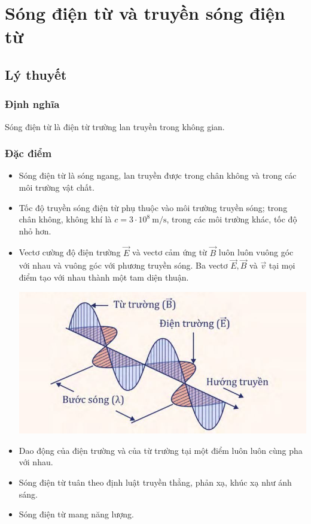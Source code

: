 
\chapter[Sóng điện từ và truyền sóng điện từ]{Sóng điện từ và truyền sóng điện từ}
\section{Lý thuyết}
\subsection{Định nghĩa}
Sóng điện từ là điện từ trường lan truyền trong không gian.
\subsection {Đặc điểm}
\begin{itemize}
	\item Sóng điện từ là sóng ngang, lan truyền được trong chân không và trong các môi trường vật chất.
	\item Tốc độ truyền sóng điện từ phụ thuộc vào môi trường truyền sóng; trong chân không, không khí là $c=3\cdot 10^8\ \text{m/s}$, trong các môi trường khác, tốc độ nhỏ hơn.
	\item Vectơ cường độ điện trường $\vec{E}$ và vectơ cảm ứng từ $\vec {B}$ luôn luôn vuông góc với nhau và vuông góc với phương truyền sóng. Ba vectơ $\vec{E}, \vec{B}$ và $\vec{v}$ tại mọi điểm tạo với nhau thành một tam diện thuận.
	\begin{center}
		\includegraphics[scale=0.7]{../figs/4-3-1.JPG}
	\end{center}
	\item Dao động của điện trường và của từ trường tại một điểm luôn luôn cùng pha với nhau.
	\item Sóng điện từ tuân theo định luật truyền thẳng, phản xạ, khúc xạ như ánh sáng.
	\item Sóng điện từ mang năng lượng.

\end{itemize}
